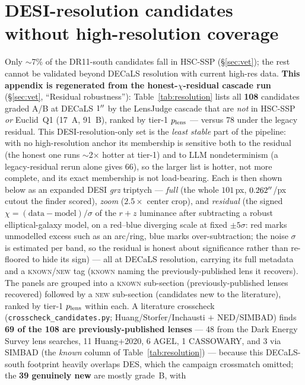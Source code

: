 \documentclass[11pt,letterpaper]{article}
\begin{document}
\section{DESI-resolution candidates without high-resolution coverage}
\label{app:resolution}
Only $\sim$7\% of the DR11-south candidates fall in HSC-SSP (\S\ref{sec:vet}); the rest cannot be
validated beyond DECaLS resolution with current high-res data. \textbf{This appendix is regenerated from
the honest-$\chi$-residual cascade run} (\S\ref{sec:vet}, ``Residual robustness''):
Table~\ref{tab:resolution} lists all \textbf{108} candidates graded A/B at DECaLS $1^{\prime\prime}$ by the
LensJudge cascade that are \emph{not} in HSC-SSP \emph{or} Euclid~Q1 (17~A, 91~B), ranked by tier-1
$p_{\rm lens}$ --- versus 78 under the legacy residual. This DESI-resolution-only set is the
\emph{least stable} part of the pipeline: with no high-resolution anchor its membership is sensitive both
to the residual (the honest one runs $\sim$2$\times$ hotter at tier-1) and to LLM nondeterminism (a
legacy-residual rerun alone gives 66), so the larger list is hotter, not more complete, and its exact
membership is not load-bearing. Each is then shown below as an
expanded DESI \emph{grz} triptych --- \emph{full} (the whole $101$\,px,
$0.262^{\prime\prime}$/px cutout the finder scored), \emph{zoom} ($2.5\times$ center crop), and \emph{residual}
(the signed $\chi=(\mathrm{data}-\mathrm{model})/\sigma$ of the $r{+}z$ luminance after subtracting a
robust elliptical-galaxy model, on a red--blue diverging scale at fixed $\pm5\sigma$: red marks
unmodelled excess such as an arc/ring, blue marks over-subtraction; the noise $\sigma$ is estimated
per band, so the residual is honest about significance rather than re-floored to hide its sign) --- all
at DECaLS resolution, carrying its full metadata and a \textsc{known}/\textsc{new} tag (\textsc{known}
naming the previously-published lens it recovers). The panels are grouped into a \textsc{known} sub-section
(previously-published lenses recovered) followed by a \textsc{new} sub-section (candidates new to the
literature), ranked by tier-1 $p_{\rm lens}$ within each. A literature crosscheck (\texttt{crosscheck\_candidates.py};
Huang/Storfer/Inchausti $+$ NED/SIMBAD) finds \textbf{69 of the 108 are previously-published lenses} ---
48 from the Dark Energy Survey lens searches, 11 Huang+2020, 6 AGEL, 1 CASSOWARY, and 3 via SIMBAD (the
\emph{known} column of Table~\ref{tab:resolution}) --- because this DECaLS-south footprint heavily overlaps
DES, which the campaign crossmatch omitted; the \textbf{39 genuinely new} are mostly grade~B, with
\end{document}

